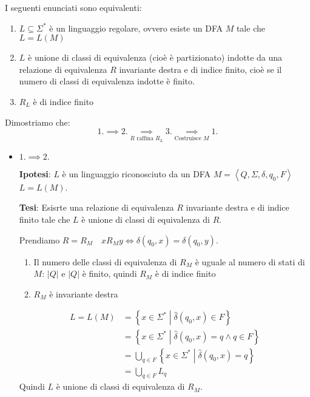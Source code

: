 \documentclass[a4paper]{article}
\begin{document}
\begin{theorem}
  I seguenti enunciati sono equivalenti:
  \begin{enumerate}
    \item \( L \subseteq \Sigma^* \) è un linguaggio regolare, ovvero esiste un
      DFA \( M \) tale che \( L = L(M) \) 

    \item \( L \) è unione di classi di equivalenza (cioè è partizionato) indotte da
      una relazione di equivalenza \( R \) invariante destra e di indice finito,
      cioè se il numero di classi di equivalenza indotte è finito. 

    \item \( R_L \) è di indice finito
  \end{enumerate}
  Dimostriamo che:
  \[
    1. \implies 2. \underset{R \text{ raffina } R_L}{\implies} 3.
    \underset{\text{Costruisce } M}{\implies} 1.
  \] 
  \begin{itemize}
    \item \( 1. \implies 2. \)

      \textbf{Ipotesi}: \( L \) è un linguaggio riconosciuto da
      un DFA \( M = \left< Q, \Sigma, \delta, q_0, F \right> \) \( L = L(M) \).

      \textbf{Tesi}: Esisrte una relazione di equivalenza \( R \) invariante destra
      e di indice finito tale che \( L \) è unione di classi di equivalenza di \( R \).

      \vspace{1em}
      \noindent
      Prendiamo \( R = R_M \quad x R_M y \iff \delta(q_0, x) = \delta(q_0, y) \).
      \begin{enumerate}
        \item Il numero delle classi di equivalenza di \( R_M \) è uguale al numero
          di stati di \( M \): \( \left| Q \right| \)
          e \( \left| Q \right| \) è finito, quindi \( R_M \) è di indice finito

        \item \( R_M \) è invariante destra
      \end{enumerate}

      \[
        \begin{aligned}
        L = L(M) &= \left\{ x \in \Sigma^* \;\left|\; \hat{\delta}(q_0, x) \in F \right. \right\}\\
                 &= \left\{ x \in \Sigma^* \;\left|\; \hat{\delta}(q_0, x) = q \wedge q \in F \right. \right\}\\
                 &= \bigcup_{q \in F} \left\{ x \in \Sigma^* \;\left|\; \hat{\delta}(q_0, x) =
                 q \right. \right\}\\
                 &= \bigcup_{q \in F} L_q
        \end{aligned}
      \] 
      Quindi \( L \) è unione di classi di equivalenza di \( R_M \).


\end{itemize}
\end{theorem}
\end{document}
